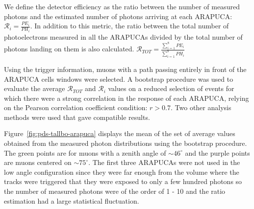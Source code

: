 We define the detector efficiency as the ratio between the number of measured photons and the estimated number of photons arriving at each ARAPUCA:
$\mathcal{R}_{i}=\frac{PE_i}{PH_i}$.
In addition to this metric, the ratio between the total number of photoelectrons measured in all the ARAPUCAs divided by the total number of photons landing on them is also calculated. 
$\mathcal{R}_{TOT}=\frac{\sum_{i=1}^8PE_i}{\sum_{i=1}^8PH_i}$


Using the trigger information, muons with a path passing entirely in front of the ARAPUCA cells windows were selected.
A bootstrap procedure \cite{stats-diaconis-efron-1983} was used to evaluate the average $\mathcal{R}_{TOT} $ and $\mathcal{R}_{i}$ values on a reduced selection of events for which there were a strong correlation in the response of each ARAPUCA, relying on the Pearson correlation coefficient condition: $r >0.7$. Two other analysis methods were used that gave compatible results. 


Figure~\ref{fig:pds-tallbo-arapuca} displays the mean of the set of average values obtained from the measured photon distributions using the bootstrap procedure.
The green points are for muons with a zenith angle of $\sim 46^{\circ}$ and the purple points are muons centered on $\sim 75^{\circ}$.
The first three ARAPUCAs were not used in the low angle configuration since they were far enough from the volume where the tracks were triggered that they were exposed to only a few hundred photons so the number of measured photons were of the order of 1 - 10 and the ratio estimation had a large statistical fluctuation. 
 
